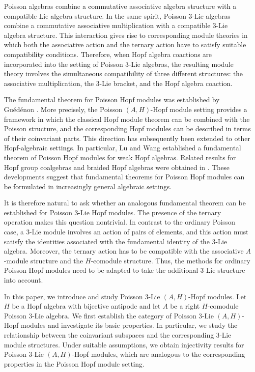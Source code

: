 \documentclass[11pt]{article}
\begin{document}
Poisson algebras combine a commutative associative algebra structure with a compatible Lie algebra structure. In the same spirit, Poisson 3-Lie algebras combine a commutative associative multiplication with a compatible 3-Lie algebra structure. This interaction gives rise to corresponding module theories in which both the associative action and the ternary action have to satisfy suitable compatibility conditions. Therefore, when Hopf algebra coactions are incorporated into the setting of Poisson 3-Lie algebras, the resulting module theory involves the simultaneous compatibility of three different structures: the associative multiplication, the 3-Lie bracket, and the Hopf algebra coaction.

The fundamental theorem for Poisson Hopf modules was established by Guédénon \cite{Gu}. More precisely, the Poisson $(A,H)$-Hopf module setting provides a framework in which the classical Hopf module theorem can be combined with the Poisson structure, and the corresponding Hopf modules can be described in terms of their coinvariant parts. This direction has subsequently been extended to other Hopf-algebraic settings. In particular, Lu and Wang \cite{LW1} established a fundamental theorem of Poisson Hopf modules for weak Hopf algebras. Related results for Hopf group coalgebras and braided Hopf algebras were obtained in \cite{LW2,LW3}. These developments suggest that fundamental theorems for Poisson Hopf modules can be formulated in increasingly general algebraic settings.

It is therefore natural to ask whether an analogous fundamental theorem can be established for Poisson 3-Lie Hopf modules. The presence of the ternary operation makes this question nontrivial. In contrast to the ordinary Poisson case, a 3-Lie module involves an action of pairs of elements, and this action must satisfy the identities associated with the fundamental identity of the 3-Lie algebra. Moreover, the ternary action has to be compatible with the associative $A$-module structure and the $H$-comodule structure. Thus, the methods for ordinary Poisson Hopf modules need to be adapted to take the additional 3-Lie structure into account.

In this paper, we introduce and study Poisson 3-Lie $(A,H)$-Hopf modules. Let $H$ be a Hopf algebra with bijective antipode and let $A$ be a right $H$-comodule Poisson 3-Lie algebra. We first establish the category of Poisson 3-Lie $(A,H)$-Hopf modules and investigate its basic properties. In particular, we study the relationship between the coinvariant subspaces and the corresponding 3-Lie module structures. Under suitable assumptions, we obtain injectivity results for Poisson 3-Lie $(A,H)$-Hopf modules, which are analogous to the corresponding properties in the Poisson Hopf module setting.
\end{document}
